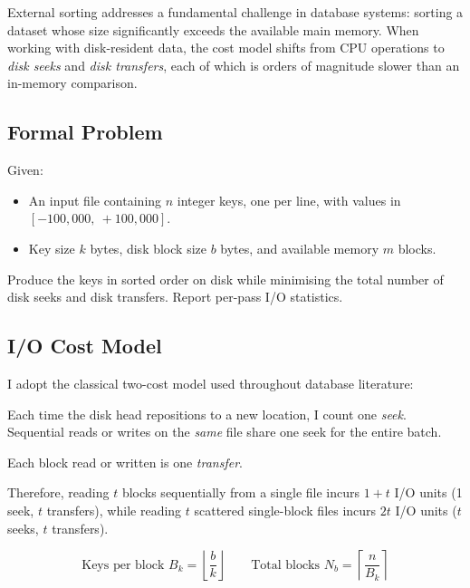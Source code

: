 \documentclass[12pt,a4paper]{article}
\begin{document}
External sorting addresses a fundamental challenge in database systems: sorting a
dataset whose size significantly exceeds the available main memory. When working
with disk-resident data, the cost model shifts from CPU operations to
\emph{disk seeks} and \emph{disk transfers}, each of which is orders of magnitude
slower than an in-memory comparison.

\subsection{Formal Problem}

Given:
\begin{itemize}[noitemsep]
  \item An input file containing $n$ integer keys, one per line,
        with values in $[-100{,}000,\ +100{,}000]$.
  \item Key size $k$ bytes, disk block size $b$ bytes, and available
        memory $m$ blocks.
\end{itemize}
Produce the keys in sorted order on disk while minimising the total number of
disk seeks and disk transfers. Report per-pass I/O statistics.

\subsection{I/O Cost Model}

I adopt the classical two-cost model used throughout database literature:

\begin{description}[noitemsep]
  \item[Seek cost:] Each time the disk head repositions to a new location,
    I count one \emph{seek}. Sequential reads or writes on the \emph{same}
    file share one seek for the entire batch.
  \item[Transfer cost:] Each block read or written is one \emph{transfer}.
\end{description}

Therefore, reading $t$ blocks sequentially from a single file incurs
$1 + t$ I/O units (1 seek, $t$ transfers), while reading $t$ scattered
single-block files incurs $2t$ I/O units ($t$ seeks, $t$ transfers).

\[
  \text{Keys per block } B_k = \left\lfloor \frac{b}{k} \right\rfloor
  \qquad
  \text{Total blocks } N_b = \left\lceil \frac{n}{B_k} \right\rceil
\]

\end{document}

